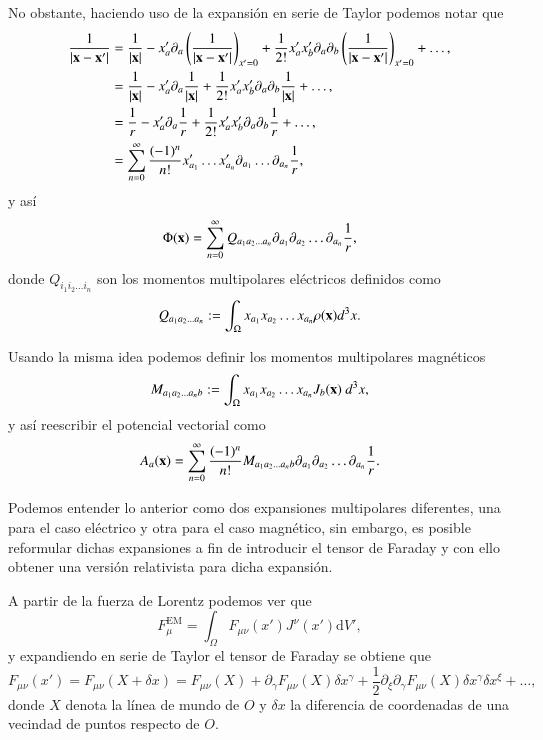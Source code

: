 No obstante, haciendo uso de la expansión en serie de Taylor podemos notar que
\begin{align}
\frac{1}{|\vb{x} - \vb{x}'|} &= \frac{1}{|\vb{x}|} - x'_a \partial_a \left( \frac{1}{|\vb{x} - \vb{x}'|} \right)_{x'=0} + \frac{1}{2!} x'_a x'_b \partial_a \partial_b \left( \frac{1}{|\vb{x} - \vb{x}'|} \right)_{x'=0} + \dots,\\
&= \frac{1}{|\vb{x}|} - x'_a \partial_a \frac{1}{|\vb{x}|} + \frac{1}{2!} x'_a x'_b \partial_a \partial_b \frac{1}{|\vb{x}|} + \dots,\\
&= \frac{1}{r}  - x'_a \partial_a \frac{1}{r} + \frac{1}{2!} x'_a x'_b \partial_a \partial_b \frac{1}{r} + \dots,\\
&= \sum_{n=0}^{\infty} \frac{(-1)^n}{n!} x'_{a_1} \dots x'_{a_n} \partial_{a_1} \dots \partial_{a_n} \frac{1}{r},
\end{align}
y así
\begin{equation}
\Phi(\vb{x}) = \sum_{n=0}^{\infty} Q_{a_1 a_2 \dots a_n} \partial_{a_1} \partial_{a_2} \dots \partial_{a_n} \frac{1}{r},
\end{equation}
donde $Q_{i_1 i_2 \dots i_n}$ son los momentos multipolares eléctricos definidos como
\begin{equation}
Q_{a_1 a_2 \dots a_n} := \int_{\Omega} x_{a_1} x_{a_2} \dots x_{a_n} \rho(\vb{x}) d^3x.
\end{equation}

Usando la misma idea podemos definir los momentos multipolares magnéticos
\begin{equation}
M_{a_1 a_2 \dots a_n b} := \int_{\Omega} x_{a_1} x_{a_2} \dots x_{a_n} J_b(\vb{x}) \  d^3x,
\end{equation}
y así reescribir el potencial vectorial como
\begin{equation}
A_a(\vb{x}) = \sum_{n=0}^{\infty} \frac{(-1)^n}{n!} M_{a_1 a_2 \dots a_n b} \partial_{a_1} \partial_{a_2} \dots \partial_{a_n} \frac{1}{r}.
\end{equation}

Podemos entender lo anterior como dos expansiones multipolares diferentes, una para el caso eléctrico y otra para el caso magnético, sin embargo, es posible reformular dichas expansiones a fin de introducir el tensor de Faraday y con ello obtener una versión relativista para dicha expansión.

A partir de la fuerza de Lorentz podemos ver que
\begin{equation}
\label{eq:106}
F^{\mathrm{EM}}_{\mu} = \int_{\Omega} F_{\mu \nu}(x') J^{\nu}(x') \mathrm{d}V',
\end{equation}
y expandiendo en serie de Taylor el tensor de Faraday se obtiene que
\begin{equation}
\label{eq:107}
F_{\mu \nu}(x') = F_{\mu \nu}(X + \delta x) = F_{\mu \nu}(X) +  \partial_{\gamma} F_{\mu \nu}(X) \delta x^{\gamma} +  \frac{1}{2} \partial_{\xi} \partial_{\gamma} F_{\mu \nu}(X) \delta x^{\gamma} \delta x^{\xi} + \dots,
\end{equation}
donde $X$ denota la línea de mundo de $O$ y $\delta x$ la diferencia de coordenadas de una vecindad de puntos respecto de $O$. 

